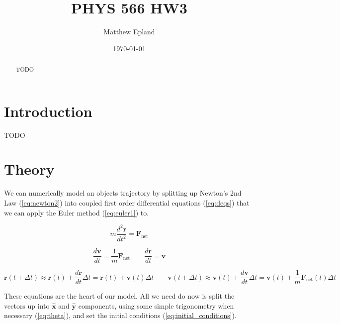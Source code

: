 \documentclass[notitlepage,aps,prd,nofootinbib]{revtex4-1}
\begin{document}
\title{PHYS 566 HW3}
\author{Matthew Epland}

\date{\today}

\begin{abstract}
TODO
\end{abstract}\maketitle


\section{Introduction}
\label{sec:intro}
TODO

\section{Theory}
\label{sec:theory}
We can numerically model an objects trajectory by splitting up Newton's 2nd Law (\ref{eq:newton2}) into coupled first order differential equations (\ref{eq:deqs}) that we can apply the Euler method (\ref{eq:euler1}) to.

\begin{equation} \label{eq:newton2}
m \frac{d^2 \mathbf{r}}{d t^2} = \mathbf{F}_{\text{net}} 
\end{equation}

\begin{equation} \label{eq:deqs}
\frac{d \mathbf{v}}{d t} = \frac{1}{m} \mathbf{F}_{\text{net}}
\qquad
\frac{d \mathbf{r}}{d t} = \mathbf{v}
\end{equation}

\begin{equation} \label{eq:euler1}
\mathbf{r}\left(t + \Delta t\right) \approx \mathbf{r}\left(t\right) + \frac{d \mathbf{r}}{d t} \Delta t = \mathbf{r}\left(t\right) + \mathbf{v}\left(t\right) \Delta t
\qquad
\mathbf{v}\left(t + \Delta t\right) \approx \mathbf{v}\left(t\right) + \frac{d \mathbf{v}}{d t} \Delta t = \mathbf{v}\left(t\right) + \frac{1}{m}\mathbf{F}_{\text{net}}\left(t\right) \Delta t
\end{equation}

These equations are the heart of our model. All we need do now is split the vectors up into $\hat{\mathbf{x}}$ and $\hat{\mathbf{y}}$ components, using some simple trigonometry when necessary (\ref{eq:theta}), and set the initial conditions (\ref{eq:initial_conditions}).
\end{document}

